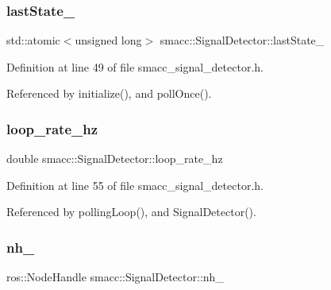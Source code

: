 \subsubsection{\texorpdfstring{last\+State\+\_\+}{lastState\_}}
{\footnotesize\ttfamily std\+::atomic$<$unsigned long$>$ smacc\+::\+Signal\+Detector\+::last\+State\+\_\+\hspace{0.3cm}{\ttfamily [private]}}



Definition at line 49 of file smacc\+\_\+signal\+\_\+detector.\+h.



Referenced by initialize(), and poll\+Once().

\mbox{\label{classsmacc_1_1SignalDetector_a41a2ae4262ed350f46d8b886bdc1dfa5}} 
\subsubsection{\texorpdfstring{loop\+\_\+rate\+\_\+hz}{loop\_rate\_hz}}
{\footnotesize\ttfamily double smacc\+::\+Signal\+Detector\+::loop\+\_\+rate\+\_\+hz\hspace{0.3cm}{\ttfamily [private]}}



Definition at line 55 of file smacc\+\_\+signal\+\_\+detector.\+h.



Referenced by polling\+Loop(), and Signal\+Detector().

\mbox{\label{classsmacc_1_1SignalDetector_a5c416677fd537afc79f2fbc2e68b2dee}} 
\subsubsection{\texorpdfstring{nh\+\_\+}{nh\_}}
{\footnotesize\ttfamily ros\+::\+Node\+Handle smacc\+::\+Signal\+Detector\+::nh\+\_\+\hspace{0.3cm}{\ttfamily [private]}}



